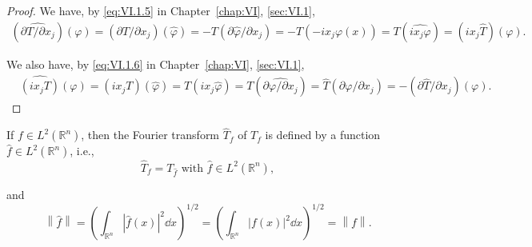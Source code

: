 \begin{proof}
 We have, by \eqref{eq:VI.1.5} in Chapter~\ref{chap:VI}, \ref{sec:VI.1}, 
\[
\begin{gathered}
(\widehat {\partial T / \partial x _{j}}) (\varphi) = (\partial T / \partial x _{j}) (\widehat {\varphi}) = - T (\partial \widehat {\varphi} / \partial x _{j}) = - T (- i x _{j} \varphi (x)) = T (\widehat {i x _{j} \varphi}) = (i x _{j} \widehat {T}) (\varphi).
\end{gathered}
\]

We also have, by \eqref{eq:VI.1.6} in Chapter~\ref{chap:VI}, \ref{sec:VI.1}, 
\[
\begin{aligned}
&\widehat {(i x _{j} T)} (\varphi)  = (i x _{j} T) (\hat {\varphi}) = T (i x _{j} \hat {\varphi}) = T (\widehat {\partial \varphi / \partial x _{j}}) = \hat {T} (\partial \varphi / \partial x _{j}) = - (\partial \hat {T} / \partial x _{j}) (\varphi).
\end{aligned}
\]
\end{proof}

\begin{theoremn} If $f \in L^2(\mathbb{R}^{n})$, then the Fourier transform $\hat{T}_f$ of $T_f$ is defined by a function $\hat{f} \in L^2(\mathbb{R}^{n})$, i.e., 
\begin{equation}\label{eq:VI.2.19}
\hat {T} _{f} = T _ {\hat {f}} \text{ with } \hat {f} \in L ^{2} (\mathbb{R}^{n}),
\end{equation}

and 
\begin{equation}\label{eq:VI.2.20}
\left\| \hat {f} \right\| = \left(\int_ {\mathbb{R}^{n}} | \hat {f} (x) | ^{2} \dd x\right) ^{1/2} = \left(\int_ {\mathbb{R}^{n}} | f (x) | ^{2} \dd x\right) ^{1/2} = \left\| f \right\|.
\end{equation}
\end{theoremn}

